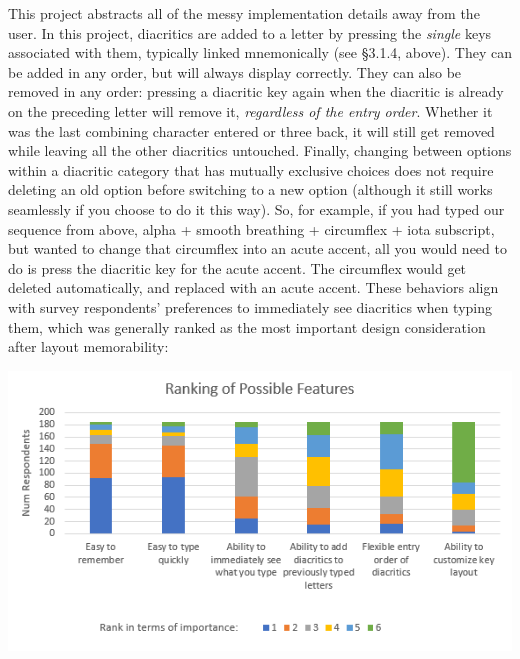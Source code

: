 \documentclass[11pt]{article}
\begin{document}
This project abstracts all of the messy implementation details away from the user. In this project, diacritics are added to a letter by pressing the \emph{single} keys associated with them, typically linked mnemonically (see §3.1.4, above). They can be added in any order, but will always display correctly. They can also be removed in any order: pressing a diacritic key again when the diacritic is already on the preceding letter will remove it, \emph{regardless of the entry order}. Whether it was the last combining character entered or three back, it will still get removed while leaving all the other diacritics untouched. Finally, changing between options within a diacritic category that has mutually exclusive choices does not require deleting an old option before switching to a new option (although it still works seamlessly if you choose to do it this way). So, for example, if you had typed our sequence from above, alpha + smooth breathing + circumflex + iota subscript, but wanted to change that circumflex into an acute accent, all you would need to do is press the diacritic key for the acute accent. The circumflex would get deleted automatically, and replaced with an acute accent. These behaviors align with survey respondents' preferences to immediately see diacritics when typing them, which was generally ranked as the most important design consideration after layout memorability:

\begin{center}
\includegraphics[width=.9\linewidth]{./images/ranking-of-possible-features.PNG}
\end{center}
\end{document}
